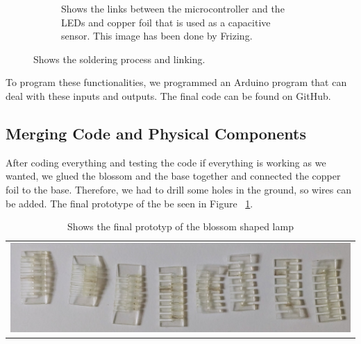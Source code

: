 \documentclass[doc.tex]{subfiles}
\begin{document}
\begin{figure}[H]
\begin{subfigure}{.45\textwidth}
                \caption{Shows the links between the microcontroller and the LEDs and copper foil that is 
                used as a capacitive sensor. This image has been done by Frizing. \cite{fritzing}}
                \label{fig:solderingProcess_3}
                \vspace{6mm}
              \end{subfigure}
            \caption{Shows the soldering process and linking.}
            \label{fig:solderingProcess}
        \end{figure}

        \noindent
        To program these functionalities, we programmed an Arduino program that can deal with these inputs 
        and outputs. The final code can be found on GitHub. %

    \subsection{Merging Code and Physical Components}
        \begin{flushleft}
            After coding everything and testing the code if everything is working as we wanted, we glued
            the blossom and the base together and connected the copper foil to the base. Therefore, we had 
            to drill some holes in the ground, so wires can be added. The final prototype of the be seen in 
            Figure ~\ref{fig:finalPrototyp}.
        \end{flushleft}

        \begin{table}[h!]
            \centering
            \begin{tabular}{c}
              \centering
              \includegraphics[width=.8\linewidth]{images/process/01_LaserCut.jpg}
            \end{tabular}
            \caption{Shows the final prototyp of the blossom shaped lamp}
            \label{fig:finalPrototyp}
        \end{table}
\end{document}
